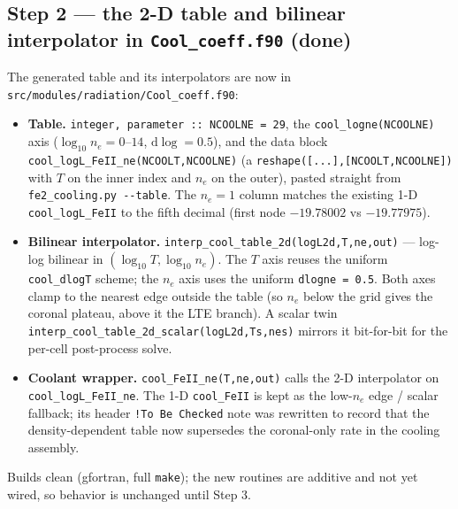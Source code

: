 \documentclass[english,a4paper]{kiseon_memo}
\begin{document}
\subsection{Step 2 --- the 2-D table and bilinear interpolator in \texttt{Cool\_coeff.f90} (done)}
The generated table and its interpolators are now in
\texttt{src/modules/radiation/Cool\_coeff.f90}:
\begin{itemize}
  \item \textbf{Table.} \verb|integer, parameter :: NCOOLNE = 29|, the
    \verb|cool_logne(NCOOLNE)| axis (\(\log_{10} n_e = 0\text{--}14\),
    \(\mathrm{d}\log = 0.5\)), and the data block
    \verb|cool_logL_FeII_ne(NCOOLT,NCOOLNE)| (a
    \verb|reshape([...],[NCOOLT,NCOOLNE])| with \(T\) on the inner index and
    \(n_e\) on the outer), pasted straight from \verb|fe2_cooling.py --table|.
    The \(n_e = 1\) column matches the existing 1-D \verb|cool_logL_FeII| to the
    fifth decimal (first node \(-19.78002\) vs \(-19.77975\)).
  \item \textbf{Bilinear interpolator.} \verb|interp_cool_table_2d(logL2d,T,ne,out)|
    --- log-log bilinear in \((\log_{10} T, \log_{10} n_e)\). The \(T\) axis
    reuses the uniform \verb|cool_dlogT| scheme; the \(n_e\) axis uses the uniform
    \verb|dlogne = 0.5|. Both axes clamp to the nearest edge outside the table
    (so \(n_e\) below the grid gives the coronal plateau, above it the LTE
    branch). A scalar twin \verb|interp_cool_table_2d_scalar(logL2d,Ts,nes)|
    mirrors it bit-for-bit for the per-cell post-process solve.
  \item \textbf{Coolant wrapper.} \verb|cool_FeII_ne(T,ne,out)| calls the 2-D
    interpolator on \verb|cool_logL_FeII_ne|. The 1-D \verb|cool_FeII| is kept as
    the low-\(n_e\) edge / scalar fallback; its header \verb|!To Be Checked| note
    was rewritten to record that the density-dependent table now supersedes the
    coronal-only rate in the cooling assembly.
\end{itemize}
Builds clean (gfortran, full \texttt{make}); the new routines are additive and
not yet wired, so behavior is unchanged until Step 3.
\end{document}
